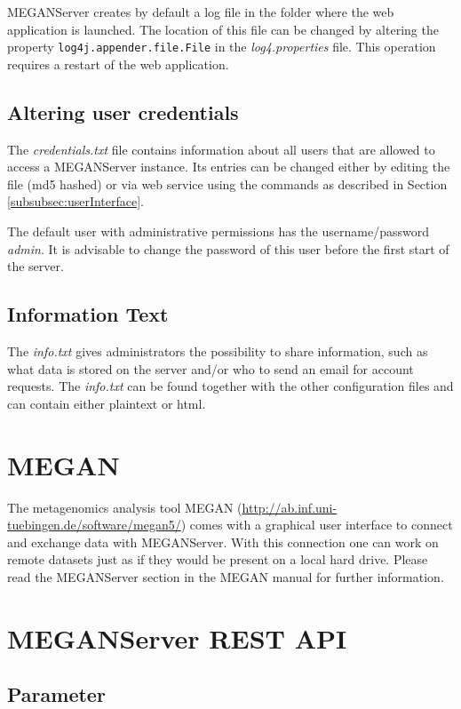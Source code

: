 \documentclass[11pt]{article}
\begin{document}
MEGANServer creates by default a log file in the folder where the web application is launched. The location of this file can be changed by altering the property \texttt{log4j.appender.file.File} in the \textit{log4.properties} file. This operation requires a restart of the web application.

\subsection{Altering user credentials}

The \textit{credentials.txt} file contains information about all users that are allowed to access a MEGANServer instance. Its entries can be changed either by editing the file (md5 hashed) or via web service using the commands as described in Section \ref{subsubsec:userInterface}.

The default user with administrative permissions has the username/password \textit{admin}. It is advisable to change the password of this user before the first start of the server.




\subsection{Information Text}

The \textit{info.txt} gives administrators the possibility to share information, such as what data is stored on the server and/or who to send an email for account requests. The \textit{info.txt} can be found together with the other configuration files and can contain either plaintext or html.

\section{MEGAN}

The metagenomics analysis tool MEGAN (\url{http://ab.inf.uni-tuebingen.de/software/megan5/}) comes with a graphical user interface to connect and exchange data with MEGANServer. With this connection one can work on remote datasets just as if they would be present on a local hard drive. Please read the MEGANServer section in the MEGAN manual for further information.


\section{MEGANServer REST API}
\subsection{Parameter}
\end{document}
